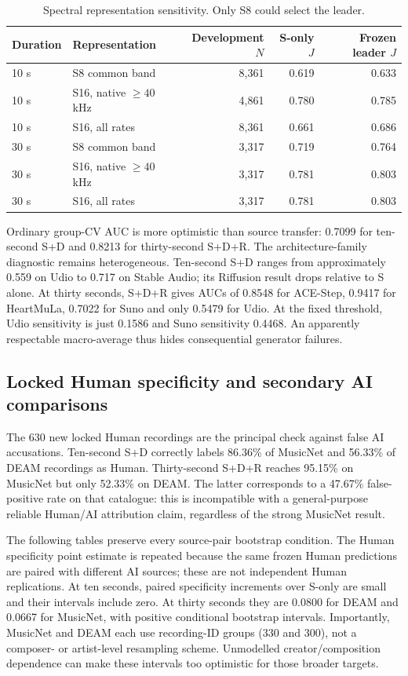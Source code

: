 \begin{table}[htbp]
\centering\small\setlength{\tabcolsep}{4pt}
\caption{Spectral representation sensitivity. Only S8 could select the leader.}
\label{tab:expanded-bandwidth-results}
\begin{tabular}{llrrr}
\toprule Duration & Representation & Development $N$ & S-only $J$ & Frozen leader $J$ \\
\midrule
10 s & S8 common band & 8,361 & 0.619 & 0.633 \\
10 s & S16, native $\geq40$ kHz & 4,861 & 0.780 & 0.785 \\
10 s & S16, all rates & 8,361 & 0.661 & 0.686 \\
30 s & S8 common band & 3,317 & 0.719 & 0.764 \\
30 s & S16, native $\geq40$ kHz & 3,317 & 0.781 & 0.803 \\
30 s & S16, all rates & 3,317 & 0.781 & 0.803 \\
\bottomrule
\end{tabular}
\end{table}

Ordinary group-CV AUC is more optimistic than source transfer: 0.7099 for
ten-second S+D and 0.8213 for thirty-second S+D+R. The architecture-family
diagnostic remains heterogeneous. Ten-second S+D ranges from approximately
0.559 on Udio to 0.717 on Stable Audio; its Riffusion result drops relative to S
alone. At thirty seconds, S+D+R gives AUCs of 0.8548 for ACE-Step, 0.9417 for
HeartMuLa, 0.7022 for Suno and only 0.5479 for Udio. At the fixed threshold,
Udio sensitivity is just 0.1586 and Suno sensitivity 0.4468. An apparently
respectable macro-average thus hides consequential generator failures.

\subsection{Locked Human specificity and secondary AI comparisons}

The 630 new locked Human recordings are the principal check against false AI
accusations. Ten-second S+D correctly labels 86.36\% of MusicNet and 56.33\%
of DEAM recordings as Human. Thirty-second S+D+R reaches 95.15\% on MusicNet
but only 52.33\% on DEAM. The latter corresponds to a 47.67\% false-positive
rate on that catalogue: this is incompatible with a general-purpose reliable
Human/AI attribution claim, regardless of the strong MusicNet result.

The following tables preserve every source-pair bootstrap condition. The Human
specificity point estimate is repeated because the same frozen Human predictions
are paired with different AI sources; these are not independent Human replications.
At ten seconds, paired specificity increments over S-only are small and their
intervals include zero. At thirty seconds they are 0.0800 for DEAM and 0.0667
for MusicNet, with positive conditional bootstrap intervals. Importantly,
MusicNet and DEAM each use recording-ID groups (330 and 300), not a
composer- or artist-level resampling scheme. Unmodelled creator/composition
dependence can make these intervals too optimistic for those broader targets.

